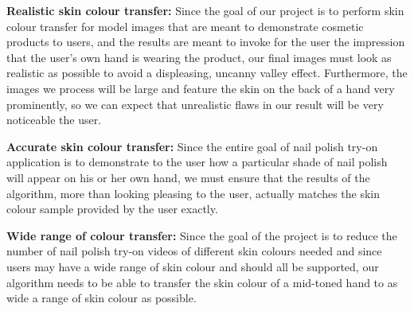 \textbf{Realistic skin colour transfer:}
Since the goal of our project is to perform skin colour transfer for model images that are meant to demonstrate cosmetic products to users, and the results are meant to invoke for the user the impression that the user's own hand is wearing the product, our final images must look as realistic as possible to avoid a displeasing, uncanny valley effect. Furthermore, the images we process will be large and feature the skin on the back of a hand very prominently, so we can expect that unrealistic flaws in our result will be very noticeable the user.

\textbf{Accurate skin colour transfer:} 
Since the entire goal of nail polish try-on application is to demonstrate to the user how a particular shade of nail polish will appear on his or her own hand, we must ensure that the results of the algorithm, more than looking pleasing to the user, actually matches the skin colour sample provided by the user exactly.

\textbf{Wide range of colour transfer:} Since the goal of the project is to reduce the number of nail polish try-on videos of different skin colours needed and since users may have a wide range of skin colour and should all be supported, our algorithm needs to be able to transfer the skin colour of a mid-toned hand to as wide a range of skin colour as possible.